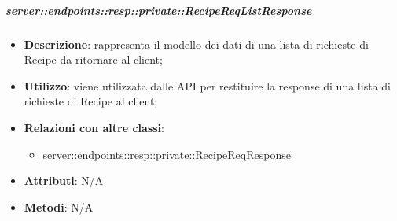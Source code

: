     \subparagraph{server::endpoints::resp::private::RecipeReqListResponse} %
    \label{subp:bdsm_app_server_endpoints_resp_private_recipereqlistresponse}
    \begin{itemize}
      \item \textbf{Descrizione}: rappresenta il modello dei dati di una lista di richieste di Recipe da ritornare al client;
      \item \textbf{Utilizzo}: viene utilizzata dalle API per restituire la response di una lista di richieste di Recipe al client;
      \item \textbf{Relazioni con altre classi}:
        \begin{itemize}
          \item server::endpoints::resp::private::RecipeReqResponse
        \end{itemize}
    \item \textbf{Attributi}: N/A
    \item \textbf{Metodi}: N/A
      \end{itemize}

